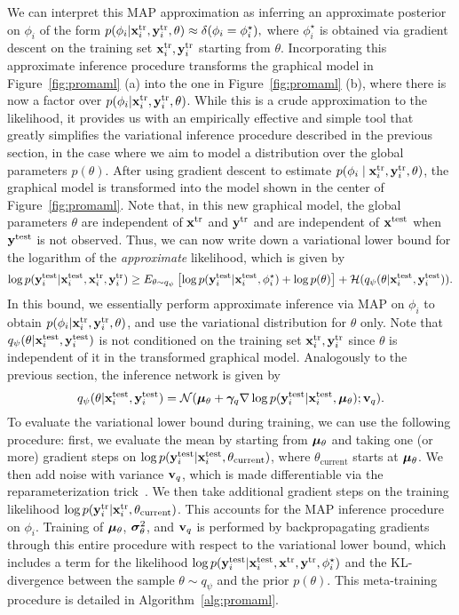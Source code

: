\documentclass{article}
\begin{document}
We can interpret this MAP approximation as inferring an approximate posterior on $\phi_i$ of the form
$
p(\phi_i | \mathbf{x}^{\text{tr}}_i, \mathbf{y}^{\text{tr}}_i, \theta) \approx \delta(\phi_i = \phi^\star_i),
$
where $\phi^\star_i$ is obtained via gradient descent on the training set $\mathbf{x}^{\text{tr}}_i,\mathbf{y}^{\text{tr}}_i$ starting from $\theta$. Incorporating this approximate inference procedure transforms the graphical model in Figure~\ref{fig:promaml} (a) into the one in Figure~\ref{fig:promaml} (b), where there is now a factor over $p(\phi_i | \mathbf{x}^{\text{tr}}_i, \mathbf{y}^{\text{tr}}_i, \theta)$.
While this is a crude approximation to the likelihood, it provides us with an empirically effective and simple tool that greatly simplifies the variational inference procedure described in the previous section, in the case where we aim to model a distribution over the global parameters $p(\theta)$.
After using gradient descent to estimate $p(\phi_i \mid \mathbf{x}^{\text{tr}}_i, \mathbf{y}^{\text{tr}}_i, \theta)$, 
the graphical model is transformed into the model shown in the center of Figure~\ref{fig:promaml}.
Note that, in this new graphical model, the global parameters $\theta$ are independent of $\mathbf{x}^{\text{tr}}$ and $\mathbf{y}^{\text{tr}}$ and are independent of $\mathbf{x}^{\text{test}}$ when $\mathbf{y}^{\text{test}}$ is not observed.
Thus, we can now write down a variational lower bound for the logarithm of the \emph{approximate} likelihood, which is given by
\begin{align*}
\log p(\mathbf{y}^{\text{test}}_i | \mathbf{x}^{\text{test}}_i, \mathbf{x}^{\text{tr}}_i, \mathbf{y}^{\text{tr}}_i) \geq 
E_{\theta \sim q_\psi} \left[
\log p(\mathbf{y}^{\text{test}}_i | \mathbf{x}^{\text{test}}_i, \phi_i^\star) + \log p(\theta)
\right] + 
\mathcal{H}(q_\psi(\theta | \mathbf{x}^{\text{test}}_i, \mathbf{y}^{\text{test}}_i)).
\end{align*}
In this bound, we essentially perform approximate inference via MAP on $\phi_i$ to obtain $p(\phi_i | \mathbf{x}^{\text{tr}}_i, \mathbf{y}^{\text{tr}}_i, \theta)$, and use the variational distribution for $\theta$ only. 
Note that $q_\psi(\theta | \mathbf{x}^{\text{test}}_i, \mathbf{y}^{\text{test}}_i)$ is not conditioned on the training set $\mathbf{x}^{\text{tr}}_i, \mathbf{y}^{\text{tr}}_i$ since $\theta$ is independent of it in the transformed graphical model.
Analogously to the previous section, the inference network is given by
\[
q_\psi(\theta | \mathbf{x}^{\text{test}}_i, \mathbf{y}^{\text{test}}_i) = 
\mathcal{N}(\bm{\mu}_\theta + \bm{\gamma}_q \nabla \log p(\mathbf{y}^{\text{test}}_i | \mathbf{x}^{\text{test}}_i, \bm{\mu}_\theta) ; \mathbf{v}_q).
\]
To evaluate the variational lower bound during training, we can use the following procedure: first, we evaluate the mean by starting from $\bm{\mu}_\theta$ and taking one (or more) gradient steps on $\log p(\mathbf{y}^{\text{test}}_i | \mathbf{x}^{\text{test}}_i, \theta_\text{current})$, where $\theta_\text{current}$ starts at $\bm{\mu}_\theta$. We then add noise with variance $\mathbf{v}_q$, which is made differentiable via the reparameterization trick~\cite{kingma2013auto}. We then take additional gradient steps on the training likelihood $\log p(\mathbf{y}^{\text{tr}}_i | \mathbf{x}^{\text{tr}}_i, \theta_\text{current})$. This accounts for the MAP inference procedure on $\phi_i$. Training of $\bm{\mu}_\theta$, $\bm{\sigma}_\theta^2$, and $\mathbf{v}_q$ is performed by backpropagating gradients through this entire procedure with respect to the variational lower bound, which includes a term for the likelihood $\log p(\mathbf{y}^{\text{test}}_i | \mathbf{x}^{\text{test}}_i, \mathbf{x}^{\text{tr}}, \mathbf{y}^{\text{tr}}, \phi_i^\star)$ and the KL-divergence between the sample $\theta \sim q_\psi$ and the prior $p(\theta)$. This meta-training procedure is detailed in Algorithm~\ref{alg:promaml}.
\end{document}
